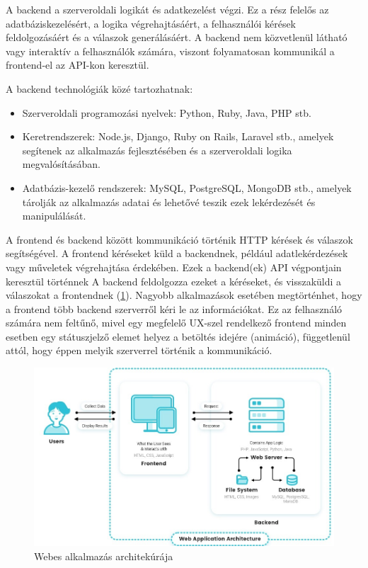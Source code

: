 A backend a szerveroldali logikát és adatkezelést végzi. Ez a rész felelős az adatbáziskezelésért, a logika végrehajtásáért, a felhasználói kérések feldolgozásáért és a válaszok generálásáért. A backend nem közvetlenül látható vagy interaktív a felhasználók számára, viszont folyamatosan kommunikál a frontend-el az API-kon keresztül.

A backend technológiák közé tartozhatnak:
\begin{itemize}
	\item Szerveroldali programozási nyelvek: Python, Ruby, Java, PHP stb.
	\item Keretrendszerek: Node.js, Django, Ruby on Rails, Laravel stb., amelyek segítenek az alkalmazás fejlesztésében és a szerveroldali logika megvalósításában.
	\item Adatbázis-kezelő rendszerek: MySQL, PostgreSQL, MongoDB stb., amelyek tárolják az alkalmazás adatai és lehetővé teszik ezek lekérdezését és manipulálását.
\end{itemize}

A frontend és backend között kommunikáció történik HTTP kérések és válaszok segítségével. A frontend kéréseket küld a backendnek, például adatlekérdezések vagy műveletek végrehajtása érdekében. Ezek a backend(ek) API végpontjain keresztül történnek A backend feldolgozza ezeket a kéréseket, és visszaküldi a válaszokat a frontendnek (\ref{abra:Architektura}). Nagyobb alkalmazások esetében megtörténhet, hogy a frontend több backend szerverről kéri le az információkat. Ez az felhasználó számára nem feltűnő, mivel egy megfelelő UX-szel rendelkező frontend minden esetben egy státuszjelző elemet helyez a betöltés idejére (animáció), függetlenül attól, hogy éppen melyik szerverrel történik a kommunikáció.

\begin{figure}[!h]
	\centering
	\includegraphics[scale=0.4]{images/architektura}
	\caption{Webes alkalmazás architekúrája}
	\label{abra:Architektura}
\end{figure}

